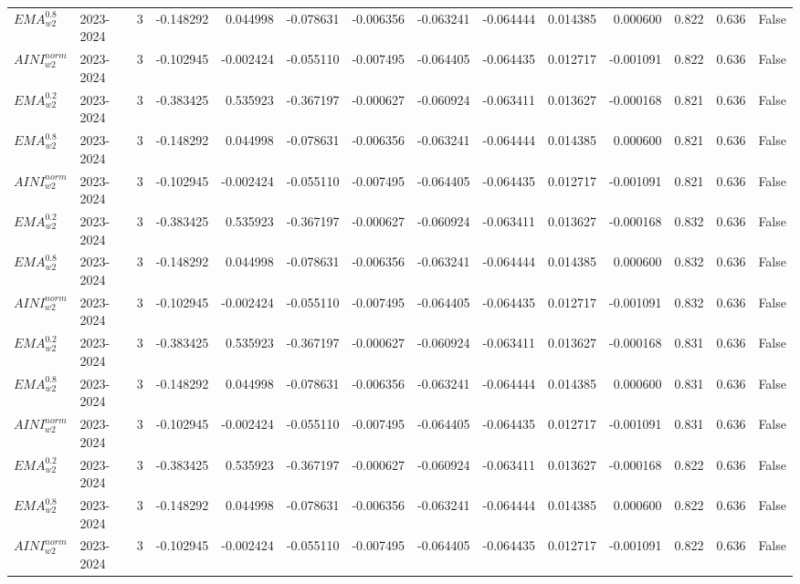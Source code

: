 \begin{tabular}{@{}llrrrrrrrrrlll@{}}
$EMA^{0.8}_{w2}$ & 2023-2024 & 3 & -0.148292 & 0.044998 & -0.078631 & -0.006356 & -0.063241 & -0.064444 & 0.014385 & 0.000600 & 0.822 & 0.636 & False \\
$AINI^{norm}_{w2}$ & 2023-2024 & 3 & -0.102945 & -0.002424 & -0.055110 & -0.007495 & -0.064405 & -0.064435 & 0.012717 & -0.001091 & 0.822 & 0.636 & False \\
$EMA^{0.2}_{w2}$ & 2023-2024 & 3 & -0.383425 & 0.535923 & -0.367197 & -0.000627 & -0.060924 & -0.063411 & 0.013627 & -0.000168 & 0.821 & 0.636 & False \\
$EMA^{0.8}_{w2}$ & 2023-2024 & 3 & -0.148292 & 0.044998 & -0.078631 & -0.006356 & -0.063241 & -0.064444 & 0.014385 & 0.000600 & 0.821 & 0.636 & False \\
$AINI^{norm}_{w2}$ & 2023-2024 & 3 & -0.102945 & -0.002424 & -0.055110 & -0.007495 & -0.064405 & -0.064435 & 0.012717 & -0.001091 & 0.821 & 0.636 & False \\
$EMA^{0.2}_{w2}$ & 2023-2024 & 3 & -0.383425 & 0.535923 & -0.367197 & -0.000627 & -0.060924 & -0.063411 & 0.013627 & -0.000168 & 0.832 & 0.636 & False \\
$EMA^{0.8}_{w2}$ & 2023-2024 & 3 & -0.148292 & 0.044998 & -0.078631 & -0.006356 & -0.063241 & -0.064444 & 0.014385 & 0.000600 & 0.832 & 0.636 & False \\
$AINI^{norm}_{w2}$ & 2023-2024 & 3 & -0.102945 & -0.002424 & -0.055110 & -0.007495 & -0.064405 & -0.064435 & 0.012717 & -0.001091 & 0.832 & 0.636 & False \\
$EMA^{0.2}_{w2}$ & 2023-2024 & 3 & -0.383425 & 0.535923 & -0.367197 & -0.000627 & -0.060924 & -0.063411 & 0.013627 & -0.000168 & 0.831 & 0.636 & False \\
$EMA^{0.8}_{w2}$ & 2023-2024 & 3 & -0.148292 & 0.044998 & -0.078631 & -0.006356 & -0.063241 & -0.064444 & 0.014385 & 0.000600 & 0.831 & 0.636 & False \\
$AINI^{norm}_{w2}$ & 2023-2024 & 3 & -0.102945 & -0.002424 & -0.055110 & -0.007495 & -0.064405 & -0.064435 & 0.012717 & -0.001091 & 0.831 & 0.636 & False \\
$EMA^{0.2}_{w2}$ & 2023-2024 & 3 & -0.383425 & 0.535923 & -0.367197 & -0.000627 & -0.060924 & -0.063411 & 0.013627 & -0.000168 & 0.822 & 0.636 & False \\
$EMA^{0.8}_{w2}$ & 2023-2024 & 3 & -0.148292 & 0.044998 & -0.078631 & -0.006356 & -0.063241 & -0.064444 & 0.014385 & 0.000600 & 0.822 & 0.636 & False \\
$AINI^{norm}_{w2}$ & 2023-2024 & 3 & -0.102945 & -0.002424 & -0.055110 & -0.007495 & -0.064405 & -0.064435 & 0.012717 & -0.001091 & 0.822 & 0.636 & False \\

\end{tabular}
